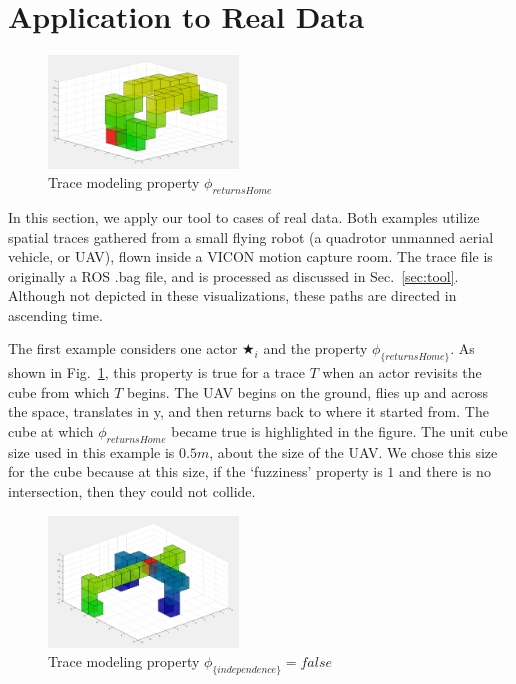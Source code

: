 \vspace{-0.1cm}
\section{Application to Real Data}
\label{sec:application}

\begin{figure}
  \vspace{-0.4cm}
  \centering
  \includegraphics[width=0.45\textwidth]{./figures/returnsHome}
    \caption{Trace modeling property $\phi_{returnsHome}$}
    \label{fig:returnsHome}
\end{figure}
In this section, we apply our tool to cases of real data.
Both examples utilize spatial traces gathered from a small flying robot (a quadrotor unmanned aerial vehicle, or UAV), flown inside a VICON motion capture room.
The trace file is originally a ROS .bag file, and is processed as discussed in Sec.~\ref{sec:tool}. 
Although not depicted in these visualizations, these paths are directed in ascending time. 

The first example considers one actor $\bigstar_i$ and the property $\phi_{\{returnsHome\}}$.  
As shown in Fig.~\ref{fig:returnsHome}, this property is true for a trace $T$ when an actor revisits the cube from which $T$ begins.
The UAV begins on the ground, flies up and across the space, translates in y, and then returns back to where it started from.
The cube at which $\phi_{returnsHome}$ became true is highlighted in the figure.
The unit cube size used in this example is $0.5m$, about the size of the UAV.
We chose this size for the cube because at this size, if the `fuzziness' property is $1$ and there is no intersection, then they could not collide.

\begin{figure}
  \vspace{-0.4cm}
  \centering
  \includegraphics[width=0.45\textwidth]{./figures/independence.png}
  \caption{Trace modeling property $\phi_{\{independence\}} = false$}
    \label{fig:independence}
\end{figure}


